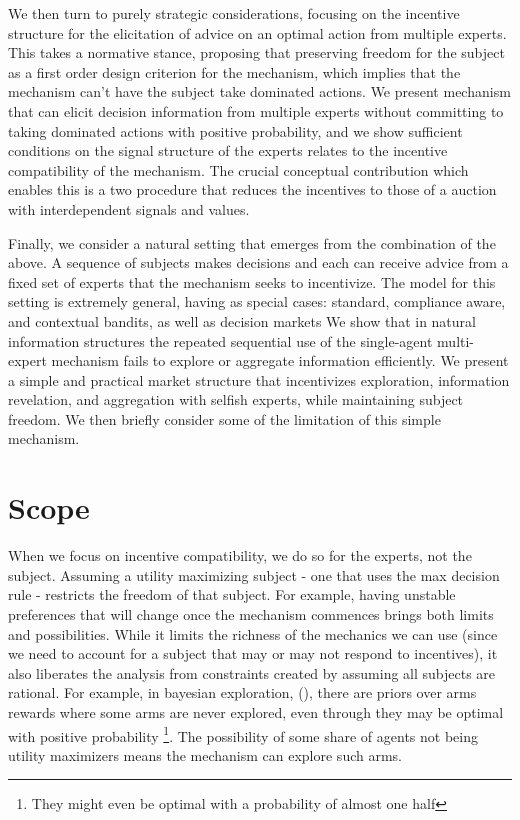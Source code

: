 We then turn to purely strategic considerations, focusing on the incentive structure for the elicitation of advice on an optimal action from multiple experts.
This takes a normative stance, proposing that preserving freedom for the subject as a first order design criterion for the mechanism, which implies that the mechanism can't have the subject take dominated actions.
We present mechanism that can elicit decision information from multiple experts without committing to taking dominated actions with positive probability, and we show sufficient conditions on the signal structure of the experts relates to the incentive compatibility of the mechanism.
The crucial conceptual contribution which enables this is a two procedure that reduces the incentives to those of a auction with interdependent signals and values. 


Finally, we consider a natural setting that emerges from the combination of the above. A sequence of subjects makes decisions and each can receive advice from a fixed set of experts that the mechanism seeks to incentivize.
The model for this setting is extremely general, having as special cases: standard, compliance aware, and contextual bandits, as well as decision markets
We show that in natural information structures the repeated sequential use of the single-agent multi-expert mechanism fails to explore or aggregate information efficiently.
We present a simple and practical market structure that incentivizes exploration, information revelation, and aggregation with selfish experts, while maintaining subject freedom. We then briefly consider some of the limitation of this simple mechanism.


\section{Scope}

When we focus on incentive compatibility, we do so for the experts, not the subject.
Assuming a utility maximizing subject - one that uses the max decision rule - restricts the freedom of that subject.
For example, having unstable preferences that will change once the mechanism commences brings both limits and possibilities.
While it limits the richness of the mechanics we can use (since we need to account for a subject that may or may not respond to incentives), it also liberates the analysis from constraints created by assuming all subjects are rational.
For example, in bayesian  exploration, (\cite{mansour2015bayesian}), there are priors over arms rewards where some arms are never explored, even through they may be optimal with positive probability \footnote{They might even be optimal with a probability of almost one half}. The possibility of some share of agents not being utility maximizers means the mechanism can explore such arms.

